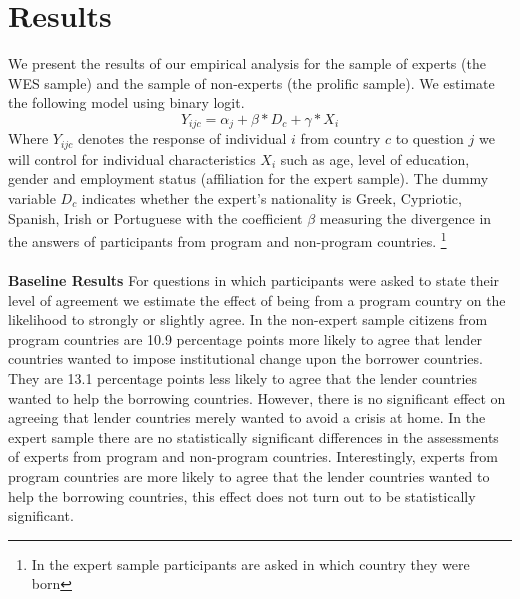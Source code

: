 
\section{Results}
We present the results of our empirical analysis for the sample of experts (the WES sample) and the sample of non-experts (the prolific sample).  We estimate the following model using binary logit. 
\begin{equation*}
    Y_{ijc}= \alpha_{j}+ \beta *D_{c} + \gamma*X_{i}
\end{equation*}
Where $Y_{ijc}$ denotes the response of individual $i$ from country $c$ to question $j$ we will control for individual characteristics $X_{i}$ such as age, level of education, gender and employment status (affiliation for the expert sample). The dummy variable $D_{c}$ indicates whether the expert's nationality is Greek, Cypriotic, Spanish, Irish or Portuguese with the coefficient $\beta$ measuring the divergence in the answers of participants from program and non-program countries. \footnote{In the expert sample participants are asked in which country they were born} \\ \\
\textbf{Baseline Results} 
For questions in which participants were asked to state their level of agreement we estimate the effect of being from a program country on the likelihood to strongly or slightly agree. In the non-expert sample citizens from program countries are 10.9 percentage points more likely to agree that lender countries wanted to impose institutional change upon the borrower countries. They are 13.1 percentage points less likely to agree that the lender countries wanted to help the borrowing countries. However, there is no significant effect on agreeing that lender countries merely wanted to avoid a crisis at home. In the expert sample there are no statistically significant differences in the assessments of experts from program and non-program countries. Interestingly, experts from program countries are more likely to agree that the lender countries wanted to help the borrowing countries, this effect does not turn out to be statistically significant.  \\ 

